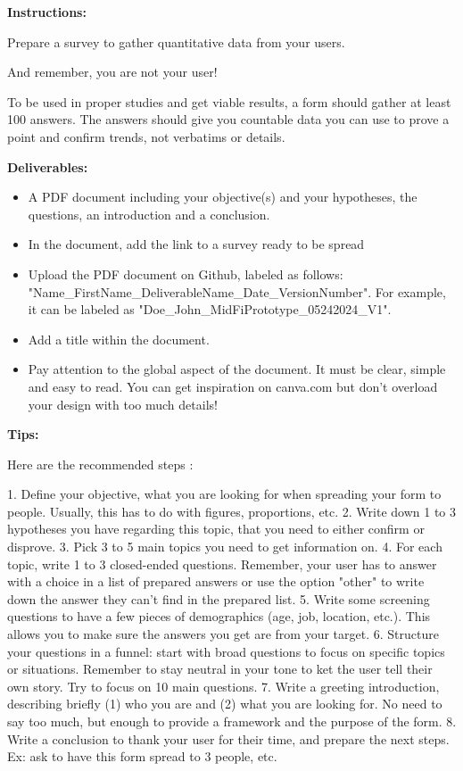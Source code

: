 \makeheaderfiles

\textbf{Instructions:}

Prepare a survey to gather quantitative data from your users.

And remember, you are not your user!

To be used in proper studies and get viable results, a form should gather at least 100 answers. The answers should give you countable data you can use to prove a point and confirm trends, not verbatims or details.

\textbf{Deliverables:}

\begin{itemize}
\item A PDF document including your objective(s) and your hypotheses, the questions, an introduction and a conclusion.
\item In the document, add the link to a survey ready to be spread
\item Upload the PDF document on Github, labeled as follows: "Name\_FirstName\_DeliverableName\_Date\_VersionNumber". For example, it can be labeled as "Doe\_John\_MidFiPrototype\_05242024\_V1".
\item Add a title within the document.
\item Pay attention to the global aspect of the document. It must be clear, simple and easy to read. You can get inspiration on canva.com but don't overload your design with too much details!
\end{itemize}

\textbf{Tips:}

Here are the recommended steps :

1. Define your objective, what you are looking for when spreading your form to people. Usually, this has to do with figures, proportions, etc.
2. Write down 1 to 3 hypotheses you have regarding this topic, that you need to either confirm or disprove.
3. Pick 3 to 5 main topics you need to get information on.
4. For each topic, write 1 to 3 closed-ended questions. Remember, your user has to answer with a choice in a list of prepared answers or use the option "other" to write down the answer they can't find in the prepared list.
5. Write some screening questions to have a few pieces of demographics (age, job, location, etc.). This allows you to make sure the answers you get are from your target.
6. Structure your questions in a funnel: start with broad questions to focus on specific topics or situations. Remember to stay neutral in your tone to ket the user tell their own story. Try to focus on 10 main questions.
7. Write a greeting introduction, describing briefly (1) who you are and (2) what you are looking for. No need to say too much, but enough to provide a framework and the purpose of the form.
8. Write a conclusion to thank your user for their time, and prepare the next steps. Ex: ask to have this form spread to 3 people, etc.

